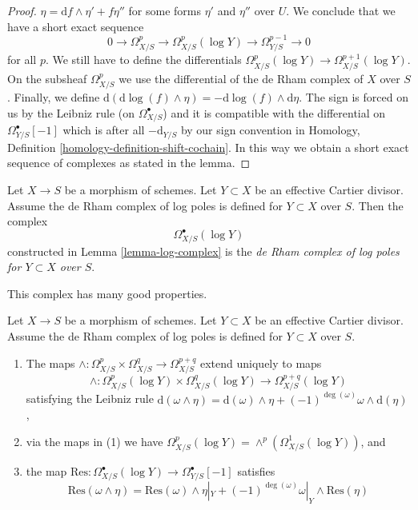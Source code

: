 \begin{proof}
$\eta = \text{d}f \wedge \eta' + f\eta''$ for some forms $\eta'$ and $\eta''$
over $U$. We conclude that
we have a short exact sequence
$$
0 \to \Omega^p_{X/S} \to \Omega^p_{X/S}(\log Y) \to \Omega^{p - 1}_{Y/S} \to 0
$$
for all $p$. We still have to define the differentials
$\Omega^p_{X/S}(\log Y) \to \Omega^{p + 1}_{X/S}(\log Y)$.
On the subsheaf $\Omega^p_{X/S}$ we use the differential of
the de Rham complex of $X$ over $S$. Finally, we define
$\text{d}(\text{d}\log(f) \wedge \eta) = -\text{d}\log(f) \wedge \text{d}\eta$.
The sign is forced on us by the Leibniz rule (on $\Omega^\bullet_{X/S}$)
and it is compatible with the differential on $\Omega^\bullet_{Y/S}[-1]$
which is after all $-\text{d}_{Y/S}$ by our sign convention in
Homology, Definition \ref{homology-definition-shift-cochain}.
In this way we obtain a short exact
sequence of complexes as stated in the lemma.
\end{proof}

\begin{definition}
\label{definition-log-complex}
Let $X \to S$ be a morphism of schemes. Let $Y \subset X$ be an
effective Cartier divisor. Assume the de Rham complex of log poles
is defined for $Y \subset X$ over $S$. Then the complex
$$
\Omega^\bullet_{X/S}(\log Y)
$$
constructed in Lemma \ref{lemma-log-complex} is the
{\it de Rham complex of log poles for $Y \subset X$ over $S$}.
\end{definition}

\noindent
This complex has many good properties.

\begin{lemma}
\label{lemma-multiplication-log}
Let $X \to S$ be a morphism of schemes. Let $Y \subset X$ be an
effective Cartier divisor. Assume the de Rham complex of log poles
is defined for $Y \subset X$ over $S$.
\begin{enumerate}
\item The maps
$\wedge : \Omega^p_{X/S} \times \Omega^q_{X/S} \to \Omega^{p + q}_{X/S}$
extend uniquely to maps
$$
\wedge : \Omega^p_{X/S}(\log Y) \times \Omega^q_{X/S}(\log Y)
\to \Omega^{p + q}_{X/S}(\log Y)
$$
satisfying the Leibniz rule
$
\text{d}(\omega \wedge \eta) = \text{d}(\omega) \wedge \eta +
(-1)^{\deg(\omega)} \omega \wedge \text{d}(\eta)$,
\item via the maps in (1) we have $\Omega^p_{X/S}(\log Y) =
\wedge^p(\Omega^1_{X/S}(\log Y))$, and
\item the map
$\text{Res} : \Omega^\bullet_{X/S}(\log Y) \to \Omega^\bullet_{Y/S}[-1]$
satisfies
$$
\text{Res}(\omega \wedge \eta) =
\text{Res}(\omega) \wedge \eta|_Y +
(-1)^{\deg(\omega)} \omega|_Y \wedge \text{Res}(\eta)
$$
\end{enumerate}
\end{lemma}

